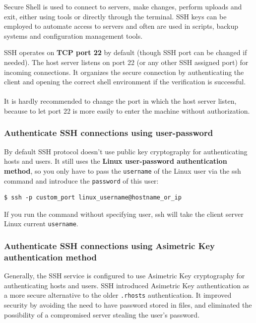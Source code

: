 \documentclass{article}
\newenvironment{blocktemplate}[1]{%
    \tcolorbox[beamer,%
    noparskip,breakable,
    colframe=Blue,%
    colbacklower=LimeGreen!75!LightGreen,%
    title=#1]}%
    {\endtcolorbox}
\newenvironment{blocktemplateI}[1]{%
    \tcolorbox[beamer,%
    noparskip,breakable,
    colframe=Violet,%
    colbacklower=Black,%
    title=#1]}%
    {\endtcolorbox}
\newenvironment{codetemplate}[1][]{%
  \mybasecolorbox[#1]
  \itshape
}{%
  \endmybasecolorbox
}
\begin{document}
Secure Shell is used to connect to servers, make changes, perform uploads and exit, either using tools or directly through the terminal. SSH keys can be employed to automate access to servers and often are used in scripts, backup systems and configuration management tools.

\begin{blocktemplateI}{NOTE}

SSH operates on \textbf{TCP port 22} by default (though SSH port can be changed if needed). The host server listens on port 22 (or any other SSH assigned port) for incoming connections. It organizes the secure connection by authenticating the client and opening the correct shell environment if the verification is successful.
\\\\
It is hardly recommended to change the port in which the host server listen, because to let port 22 is more easily to enter the machine without authorization.
\end{blocktemplateI}

\subsubsection{Authenticate SSH connections using user-password}

By default SSH protocol doesn't use public key cryptography for authenticating hosts and users. It still uses the \textbf{Linux user-password authentication method}, so you only have to pass the \verb|username| of the Linux user via the ssh command and introduce the \verb|password| of this user:

\begin{codetemplate}{}
\begin{verbatim}
$ ssh -p custom_port linux_username@hostname_or_ip
\end{verbatim}
\end{codetemplate}

\begin{blocktemplate}{NOTE}
 If you run the command without specifying user, ssh will take the client server Linux current \verb|username|.
\end{blocktemplate}

\subsubsection{Authenticate SSH connections using Asimetric Key authentication method}

Generally, the SSH service is configured to use Asimetric Key cryptography for authenticating hosts and users. SSH introduced Asimetric Key authentication as a more secure alternative to the older \verb|.rhosts| authentication. It improved security by avoiding the need to have password stored in files, and eliminated the possibility of a compromised server stealing the user's password.
\end{document}
